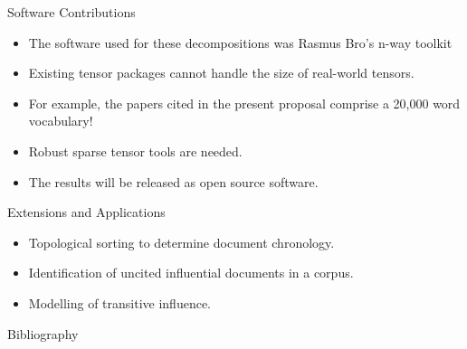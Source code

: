 \documentclass{beamer}
\begin{document}
\begin{frame}{Software Contributions}
    \begin{itemize}[<+->]
        \item The software used for these decompositions was Rasmus Bro's n-way toolkit~\cite{andersson2000}
        \item Existing tensor packages cannot handle the size of real-world tensors.
        \item For example, the papers cited in the present proposal comprise a 20,000 word vocabulary!
        \item Robust sparse tensor tools are needed.
        \item The results will be released as open source software.
    \end{itemize}
\end{frame}

\begin{frame}{Extensions and Applications}
    \begin{itemize}[<+->]
        \item Topological sorting to determine document chronology.
        \item Identification of uncited influential documents in a corpus.
        \item Modelling of transitive influence.
    \end{itemize}
\end{frame}

\begin{frame}[allowframebreaks]{Bibliography}
{}

\end{frame}
\end{document}
